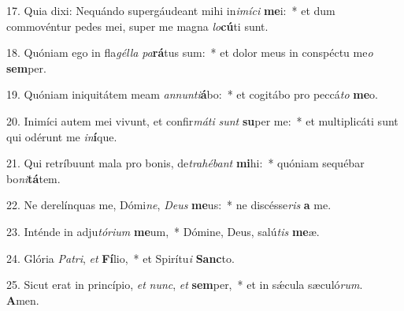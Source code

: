 17. Quia dixi: Nequándo supergáudeant mihi in\textit{i}\textit{mí}\textit{ci} \textbf{me}i:~*  et dum commovéntur pedes mei, super me magna \textit{lo}\textbf{cú}ti sunt.\

18. Quóniam ego in fla\textit{gél}\textit{la} \textit{pa}\textbf{rá}tus sum:~*  et dolor meus in conspéctu me\textit{o} \textbf{sem}per.\

19. Quóniam iniquitátem meam \textit{an}\textit{nun}\textit{ti}\textbf{á}bo:~*  et cogitábo pro peccá\textit{to} \textbf{me}o.\

20. Inimíci autem mei vivunt, et confir\textit{má}\textit{ti} \textit{sunt} \textbf{su}per me:~*  et multiplicáti sunt qui odérunt me \textit{in}\textbf{í}que.\

21. Qui retríbuunt mala pro bonis, de\textit{tra}\textit{hé}\textit{bant} \textbf{mi}hi:~*  quóniam sequébar bo\textit{ni}\textbf{tá}tem.\

22. Ne derelínquas me, Dómi\textit{ne}, \textit{De}\textit{us} \textbf{me}us:~*  ne discésse\textit{ris} \textbf{a} me.\

23. Inténde in adju\textit{tó}\textit{ri}\textit{um} \textbf{me}um,~*  Dómine, Deus, salú\textit{tis} \textbf{me}æ.\

24. Glória \textit{Pa}\textit{tri}, \textit{et} \textbf{Fí}lio,~*  et Spirítu\textit{i} \textbf{Sanc}to.\

25. Sicut erat in princípio, \textit{et} \textit{nunc}, \textit{et} \textbf{sem}per,~*  et in sǽcula sæculó\textit{rum}. \textbf{A}men.\

